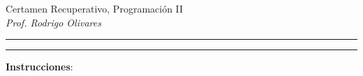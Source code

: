 \documentclass[10pt]{article}
\begin{document}
\begin{center}
    {\Large Certamen Recuperativo, Programaci\'on II} \\
    \emph{\small Prof. Rodrigo Olivares} \\

\end{center}
\vspace*{-35pt}
\begin{center}
    \rule{1\textwidth}{.3pt}
\end{center}
\vspace*{-42pt}
\begin{center}
    \rule{1\textwidth}{2pt}
\end{center}

\vspace*{-15pt}
{\small \textbf{Instrucciones}:}
\vspace*{-15pt}
\end{document}
